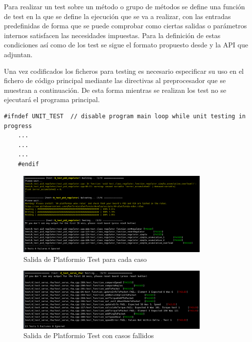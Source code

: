     Para realizar un test sobre un método o grupo de métodos se define una función de test en la que se define la ejecución que se va a realizar, con las entradas predefinidas de forma que se puede comprobar como ciertas salidas o parámetros internos satisfacen las necesidades impuestas. Para la definición de estas condiciones así como de los test se sigue el formato propuesto desde  y la API que adjuntan.
    
    Una vez codificados los ficheros para testing es necesario especificar su uso en el fichero de código principal  mediante las directivas al preprocesador que se muestran a continuación. De esta forma mientras se realizan los test no se ejecutará el programa principal.
    
    \begin{lstlisting}[frame=single]
    #ifndef UNIT_TEST  // disable program main loop while unit testing in progress
    ...
    ...
    ...
    #endif
    \end{lstlisting}

    \begin{figure}[H]
       	\centering
       	\includegraphics[width=0.85\textwidth]{figuras/Imagenes_SW/test/Seleccion_032.png}   
       	\caption{Salida de Platformio Test para cada caso}
       	\label{fig:SW:test:standard_output}
    \end{figure}
    
    \begin{figure}[H]
       	\centering
       	\includegraphics[width=0.85\textwidth]{figuras/Imagenes_SW/test/Seleccion_034.png}   
       	\caption{Salida de Platformio Test con casos fallidos}
       	\label{fig:SW:test:error_output}
    \end{figure}
    

